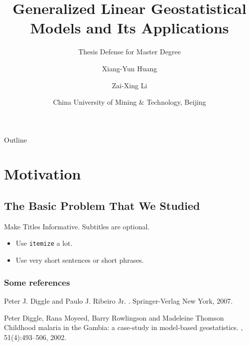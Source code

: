 \documentclass{beamer}
\title[Model-Based Geostatistics]
{Generalized Linear Geostatistical Models and Its Applications}
\subtitle{Thesis Defense for Master Degree}
\author[X.Y. Huang]{Xiang-Yun Huang\inst{1} \and Zai-Xing Li\inst{2}}
\institute[CUMTB] %
{
  \inst{1-2}%
  Department of Mathematics\\
  School of Science
}
\date[CUMTB 2018]{China University of Mining \& Technology, Beijing}
\begin{document}
\begin{frame}
  \titlepage
\end{frame}

\begin{frame}{Outline}
  \tableofcontents
\end{frame}

\section{Motivation}

\subsection{The Basic Problem That We Studied}

\begin{frame}{Make Titles Informative. }{Subtitles are optional.}
  \begin{itemize}
  \item
    Use \texttt{itemize} a lot.
  \item
    Use very short sentences or short phrases.
  \end{itemize}
\end{frame}


\appendix

\begin{frame}[allowframebreaks]
  \frametitle{Some references}
  \begin{thebibliography}{10}
    
  \beamertemplatebookbibitems

    Peter J. Diggle and Paulo J. {Ribeiro Jr}.
    .
    \newblock Springer-Verlag New York, 2007.
 
  \beamertemplatearticlebibitems

    Peter Diggle, Rana Moyeed, Barry Rowlingson and Madeleine Thomson
    \newblock Childhood malaria in the Gambia: a case-study in model-based geostatistics.
    , 51(4):493--506,
    2002.
  \end{thebibliography}
\end{frame}
\end{document}
